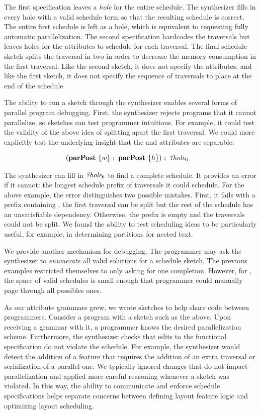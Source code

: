 The first specification leaves a \emph{hole} for the entire schedule. The synthesizer fills in every hole with a valid schedule term so that the resulting schedule is correct.  The entire first schedule is left as a hole, which is equivalent to requesting fully automatic parallelization. The second specification hardcodes the traversals but leaves holes for the attributes to schedule for each traversal. The final schedule sketch splits the  traversal in two in order to decrease the memory consumption in the first traversal. Like the second sketch, it does not specify the attributes, and like the first sketch, it does not specify the sequence of traversals to place at the end of the schedule. 

The ability to run a sketch through the synthesizer enables several forms of parallel program debugging. First, the synthesizer rejects programs that it cannot parallelize, so sketches can test programmer intuitions. For example, it could test the validity of the above idea of splitting apart the first  traversal. We could more explicitly test the underlying insight that the  and  attributes are separable:

\begin{align*}
& (\text{\textbf{parPost}} ~ \{ w  \} ~ ; ~  \text{\textbf{parPost}}~ \{ h \}) ~ ;  ~{\emph{?hole}}_6
\end{align*}

The synthesizer can fill in ${\emph{?hole}}_6$ to find a complete schedule. It provides an error if it cannot: the longest schedule prefix of traversals it could schedule. For the above example, the error distinguishes two possible mistakes. First, it fails with a prefix containing  , the first traversal can be split but the rest of the schedule has an unsatisfiable dependency. Otherwise, the prefix is empty and the traversals could not be split. We found the ability to test scheduling ideas to be particularly useful, for example, in determining partitions for nested text.

We provide another mechanism for debugging. The programmer may ask the synthesizer to \emph{enumerate} all valid solutions for a schedule sketch. The previous examples restricted themselves to only asking for one completion. However, for \hlang{}, the space of valid schedules is small enough that programmer could manually page through all possibles ones.


As our attribute grammars grew, we wrote sketches to help share code between programmers. Consider a program with a sketch such as the above. Upon receiving a grammar with it, a programmer knows the desired parallelization scheme. Furthermore, the synthesizer checks that edits to the functional specification do not violate the schedule. For example, the synthesizer would detect the addition of a feature that requires the addition of an extra traversal or serialization of a parallel one. We typically ignored changes that do not impact parallelization and applied more careful reasoning whenever a sketch was violated.  In this way, the ability to communicate and enforce schedule specifications helps separate concerns between defining layout feature logic and optimizing layout scheduling.


